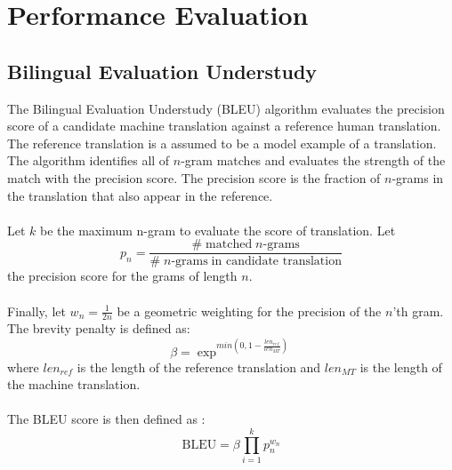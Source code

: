 \section{Performance Evaluation}
\subsection{Bilingual Evaluation Understudy}
The Bilingual Evaluation Understudy (BLEU) algorithm evaluates the precision score of a candidate machine translation against a reference human translation. The reference translation is a assumed to be a model example of a translation. The algorithm identifies all of $n$-gram matches and evaluates the strength of the match with the precision score. The precision score is the fraction of $n$-grams in the translation that also appear in the reference.
\\\\
Let $k$ be the maximum n-gram to evaluate the score of translation. Let
\begin{equation}
\label{eq:5.1}
p_n = \frac{\# \; \text{matched} \; n\text{-grams}}{\# \; n\text{-grams} \; \text{in candidate translation}}
\end{equation}
the precision score for the grams of length $n$. 
\\\\
Finally, let $w_n = \frac{1}{2n}$  be a geometric weighting for the precision of the $n$'th gram. The brevity penalty is defined as:
\begin{equation}
\label{eq:5.2}
\beta = \exp ^ {min \left(0, 1 - \frac{len_{ref}}{len_{MT}} \right)}
\end{equation}
where $len_{ref}$ is the length of the reference translation and $len_{MT}$ is the length of the machine translation.
\\\\
The BLEU score is then defined as \cite{manning2019cs224n}:
\begin{equation}
\label{eq:5.3}
\text{BLEU} = \beta \prod _{i = 1} ^ k p_n ^{w_n}
\end{equation}
\newpage
